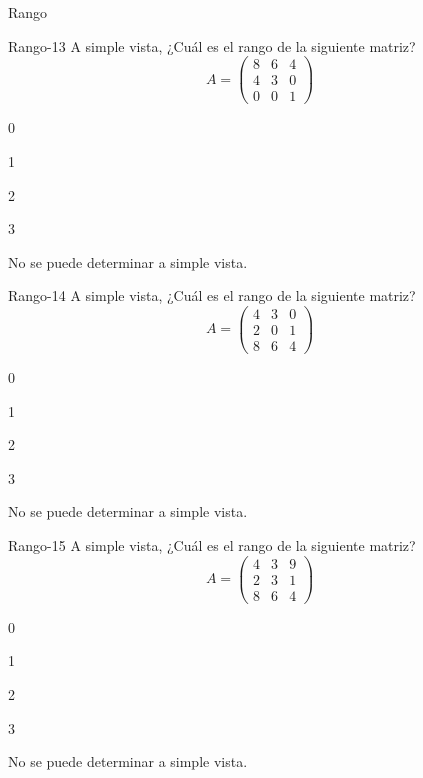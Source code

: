 \documentclass[a4,11pt]{aleph-notas}
\begin{document}
\begin{quiz}{Rango}
\begin{multi}[]%
    {Rango-13}
    A simple vista, ¿Cuál es el rango de la siguiente matriz?
    \[
        A=\begin{pmatrix} 8 & 6 & 4 \\ 4 & 3 & 0 \\ 0 & 0 & 1 \end{pmatrix}
    \]
    \item 0
    \item 1
    \item* 2
    \item 3
    \item No se puede determinar a simple vista.
\end{multi}

\begin{multi}[]%
    {Rango-14}
    A simple vista, ¿Cuál es el rango de la siguiente matriz?
    \[
        A=\begin{pmatrix} 4 & 3 & 0 \\ 2 & 0 & 1\\ 8 & 6 & 4 \end{pmatrix}
    \]
    \item 0
    \item 1
    \item 2
    \item* 3
    \item No se puede determinar a simple vista.
\end{multi}

\begin{multi}[]%
    {Rango-15}
    A simple vista, ¿Cuál es el rango de la siguiente matriz?
    \[
        A=\begin{pmatrix} 4 & 3 & 9 \\ 2 & 3 & 1\\ 8 & 6 & 4 \end{pmatrix}
    \]
    \item 0
    \item 1
    \item 2
    \item 3
    \item* No se puede determinar a simple vista.
\end{multi}

\end{quiz}
\end{document}
